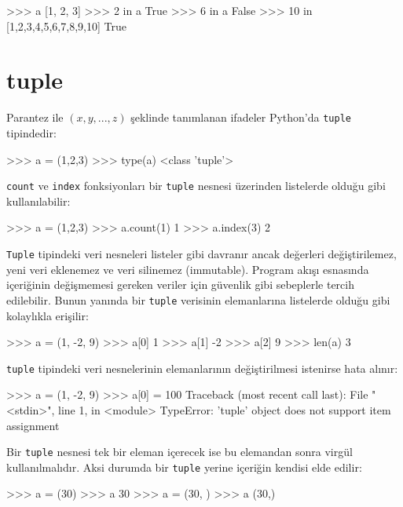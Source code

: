 \documentclass[12pt]{report}
\begin{document}
\begin{python}
>>> a
[1, 2, 3]
>>> 2 in a
True
>>> 6 in a
False
>>> 10 in [1,2,3,4,5,6,7,8,9,10]
True
\end{python}




\section{tuple}
Parantez ile $(x, y, ..., z)$ şeklinde tanımlanan ifadeler Python'da \texttt{tuple} tipindedir:

\begin{python}
>>> a = (1,2,3)
>>> type(a)
<class 'tuple'>
\end{python}

\texttt{count} ve \texttt{index} fonksiyonları bir \texttt{tuple} nesnesi üzerinden listelerde olduğu gibi kullanılabilir:

\begin{python}
>>> a = (1,2,3)
>>> a.count(1)
1
>>> a.index(3)
2
\end{python}

\texttt{Tuple} tipindeki veri nesneleri listeler gibi davranır ancak değerleri değiştirilemez, yeni veri eklenemez ve veri silinemez (immutable). Program akışı esnasında içeriğinin değişmemesi gereken veriler için güvenlik gibi sebeplerle tercih edilebilir. Bunun yanında bir \texttt{tuple} verisinin elemanlarına listelerde olduğu gibi kolaylıkla erişilir:

\begin{python}
>>> a = (1, -2, 9)
>>> a[0]
1
>>> a[1]
-2
>>> a[2]
9
>>> len(a)
3
\end{python}

\texttt{tuple} tipindeki veri nesnelerinin elemanlarının değiştirilmesi istenirse hata alınır:

\begin{python}
>>> a = (1, -2, 9)
>>> a[0] = 100
Traceback (most recent call last):
File "<stdin>", line 1, in <module>
TypeError: 'tuple' object does not support item assignment
\end{python}

Bir \texttt{tuple} nesnesi tek bir eleman içerecek ise bu elemandan sonra virgül kullanılmalıdır. Aksi durumda bir \texttt{tuple} yerine içeriğin kendisi elde edilir:

\begin{python}
>>> a = (30)
>>> a
30
>>> a = (30, )
>>> a
(30,)
\end{python}
\end{document}
